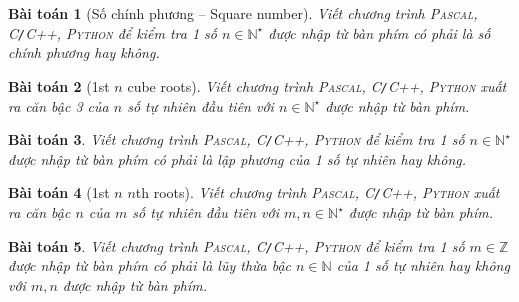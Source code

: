\documentclass{article}
\newtheorem{baitoan}{Bài toán}
\begin{document}
\begin{baitoan}[Số chính phương -- Square number]
	Viết chương trình \textsc{Pascal, C{\tt /}C++, Python} để kiểm tra 1 số $n\in\mathbb{N}^\star$ được nhập từ bàn phím có phải là số chính phương hay không.
\end{baitoan}

\begin{baitoan}[1st $n$ cube roots]
	Viết chương trình \textsc{Pascal, C{\tt /}C++, Python} xuất ra căn bậc 3 của $n$ số tự nhiên đầu tiên với $n\in\mathbb{N}^\star$ được nhập từ bàn phím.
\end{baitoan}

\begin{baitoan}
	Viết chương trình \textsc{Pascal, C{\tt /}C++, Python} để kiểm tra 1 số $n\in\mathbb{N}^\star$ được nhập từ bàn phím có phải là lập phương của 1 số tự nhiên hay không.
\end{baitoan}

\begin{baitoan}[1st $n$ $n$th roots]
	Viết chương trình \textsc{Pascal, C{\tt /}C++, Python} xuất ra căn bậc $n$ của $m$ số tự nhiên đầu tiên với $m,n\in\mathbb{N}^\star$ được nhập từ bàn phím.
\end{baitoan}

\begin{baitoan}
	Viết chương trình \textsc{Pascal, C{\tt /}C++, Python} để kiểm tra 1 số $m\in\mathbb{Z}$ được nhập từ bàn phím có phải là lũy thừa bậc $n\in\mathbb{N}$ của 1 số tự nhiên hay không với $m,n$ được nhập từ bàn phím.
\end{baitoan}
\end{document}
